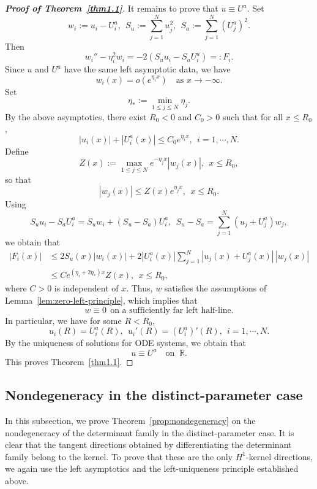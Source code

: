 \documentclass[11pt]{article}
\numberwithin{equation}{section}
\theoremstyle{definition}
\begin{document}
\begin{proof}[\normalfont\bfseries Proof of  Theorem~\ref{thm1.1}]
It remains to prove that \(u\equiv U^a\). Set
\[
w_i:=u_i-U_i^a,
\ \
S_u:=\sum_{j=1}^N u_j^2,
\ \
S_a:=\sum_{j=1}^N (U_j^a)^2.
\]
Then
\[
w_i''-\eta_i^2w_i
=
-2\left(S_u u_i-S_a U_i^a\right)
=:F_i .
\]
Since \(u\) and \(U^a\) have the same left asymptotic data, we have
\[
w_i(x)=o(e^{\eta_i x})\quad \text{as }x\to-\infty.
\]
Set
\[
\eta_*:=\min_{1\le j\le N}\eta_j .
\]
By the above asymptotics, there exist \(R_0<0\) and \(C_0>0\)
such that for all \(x\le R_0\),
\[
|u_i(x)|+|U_i^a(x)|
\le
C_0 e^{\eta_i x},
\ \  i=1,\cdots,N.
\]
Define
\[
Z(x):=
\max_{1\le j\le N}e^{-\eta_jx}|w_j(x)|, \ \  x\le R_0,
\]
so that
\[
|w_j(x)|\le Z(x)e^{\eta_jx},
\ \  x\le R_0.
\]
Using
\[
S_u u_i-S_a U_i^a
=
S_u w_i+(S_u-S_a)U_i^a,
\ \
S_u-S_a
=
\sum_{j=1}^N (u_j+U_j^a)w_j,
\]
we obtain that
\[
\begin{aligned}
	|F_i(x)|
	&\le
	2S_u(x)|w_i(x)|
	+
	2|U_i^a(x)|
	\sum_{j=1}^N |u_j(x)+U_j^a(x)|\,|w_j(x)|  \\
	&\le
	C e^{(\eta_i+2\eta_*)x}Z(x), \ \  x\le R_0,
\end{aligned}
\]
where \(C>0\) is independent of \(x\). Thus, \(w\) satisfies the
assumptions of Lemma~\ref{lem:zero-left-principle}, which implies that
\[
w\equiv0
\ \ \text{on a sufficiently far left half-line}.
\]
In particular, we have for some \(R<R_0\),
\[
u_i(R)=U_i^a(R),
\ \
u_i'(R)=(U_i^a)'(R),
\ \  i=1,\cdots,N.
\]
By the uniqueness of solutions for ODE systems, we obtain that
\[
u\equiv U^a
\quad\text{on }\ \mathbb R.
\]
This proves Theorem~\ref{thm1.1}.
\end{proof}



\subsection{Nondegeneracy in the distinct-parameter case}
In this subsection, we prove Theorem~\ref{prop:nondegeneracy} on the
nondegeneracy of the determinant family in the distinct-parameter case.
It is clear that the tangent directions obtained by differentiating the
determinant family belong to the kernel. To prove that these are the only \(H^1\)-kernel
directions, we again use the left asymptotics and the left-uniqueness
principle established above.
\end{document}
